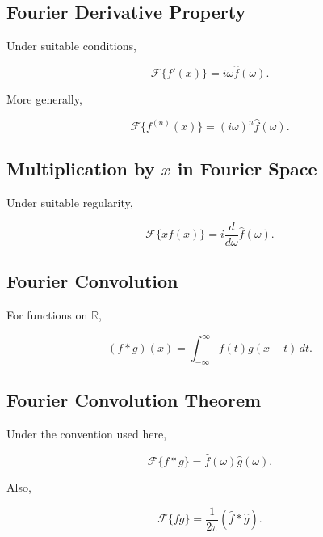 \subsection{Fourier Derivative Property}
\label{subsec:fourier-derivative-property}

Under suitable conditions,

\[
\boxed{
\mathcal{F}\{f'(x)\}
=
i\omega
\widehat f(\omega).
}
\]

More generally,

\[
\boxed{
\mathcal{F}\{f^{(n)}(x)\}
=
(i\omega)^n
\widehat f(\omega).
}
\]

\subsection{Multiplication by \(x\) in Fourier Space}
\label{subsec:fourier-multiplication-x}

Under suitable regularity,

\[
\boxed{
\mathcal{F}\{x f(x)\}
=
i
\frac{d}{d\omega}
\widehat f(\omega).
}
\]

\subsection{Fourier Convolution}
\label{subsec:fourier-convolution-reference}

For functions on \(\mathbb{R}\),

\[
\boxed{
(f*g)(x)
=
\int_{-\infty}^{\infty}
f(t)
g(x-t)
\,dt.
}
\]

\subsection{Fourier Convolution Theorem}
\label{subsec:fourier-convolution-theorem}

Under the convention used here,

\[
\boxed{
\mathcal{F}\{f*g\}
=
\widehat f(\omega)
\widehat g(\omega).
}
\]

Also,

\[
\boxed{
\mathcal{F}\{fg\}
=
\frac{1}{2\pi}
(\widehat f*\widehat g).
}
\]


